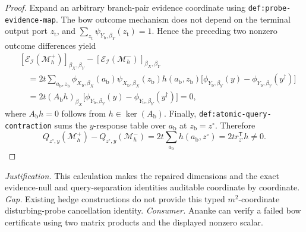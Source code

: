 \documentclass{article}
\begin{document}
\begin{proof}
Expand an arbitrary branch-pair evidence coordinate using \texttt{def:probe-evidence-map}.  The bow outcome mechanism does not depend on the terminal output port \(z_{\mathrm t}\), and \(\sum_{z_{\mathrm t}}\psi_{Y_{\mathrm b},\beta_Y}(z_{\mathrm t})=1\).  Hence the preceding two nonzero outcome differences yield
\[
\begin{aligned}
 &[\mathcal E_{\mathcal I}(\mathcal M_h^+)]_{\beta_X,\beta_Y}
 -[\mathcal E_{\mathcal I}(\mathcal M_h^-)]_{\beta_X,\beta_Y}\\
 &\quad=2t\sum_{a_{\mathrm b},z_{\mathrm b}}
 \phi_{X_{\mathrm b},\beta_X}(a_{\mathrm b})
 \psi_{X_{\mathrm b},\beta_X}(z_{\mathrm b})h(a_{\mathrm b},z_{\mathrm b})
 \bigl[\phi_{Y_{\mathrm b},\beta_Y}(y)
 -\phi_{Y_{\mathrm b},\beta_Y}(y^{\dagger})\bigr]\\
 &\quad=2t(A_{\mathrm b}h)_{\beta_X}
 \bigl[\phi_{Y_{\mathrm b},\beta_Y}(y)
 -\phi_{Y_{\mathrm b},\beta_Y}(y^{\dagger})\bigr]=0,
\end{aligned}
\]
where \(A_{\mathrm b}h=0\) follows from \(h\in\ker(A_{\mathrm b})\).  Finally, \texttt{def:atomic-query-contraction} sums the \(y\)-response table over \(a_{\mathrm b}\) at \(z_{\mathrm b}=z^{\circ}\).  Therefore
\[
 Q_{z^{\circ},y}(\mathcal M_h^+)-Q_{z^{\circ},y}(\mathcal M_h^-)
 =2t\sum_{a_{\mathrm b}}h(a_{\mathrm b},z^{\circ})
 =2t r_{z^{\circ}}^{\mathsf T}h\ne0.
\]
\end{proof}
\par\smallskip\noindent \textit{Justification.} This calculation makes the repaired dimensions and the exact evidence-null and query-separation identities auditable coordinate by coordinate. \textit{Gap.} Existing hedge constructions do not provide this typed \(m^2\)-coordinate disturbing-probe cancellation identity. \textit{Consumer.} Ananke can verify a failed bow certificate using two matrix products and the displayed nonzero scalar.
\end{document}
